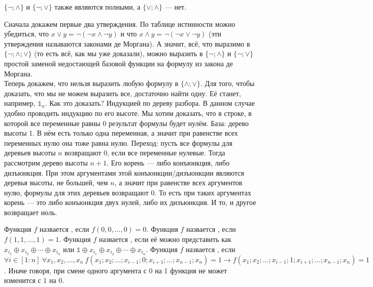 \documentclass{article}
\begin{document}
\begin{itemize}
\begin{Comment}
\begin{Example}
            \end{Example}
        \end{Comment}
        \thm $\{\neg;\land\}$ и $\{\neg;\lor\}$ также являются полными, а $\{\lor;\land\}$ --- нет.
        \begin{Proof}
            Сначала докажем первые два утверждения. По таблице истинности можно убедиться, что $x\lor y=\neg(\neg x\land\neg y)$ и что $x\land y=\neg(\neg x\lor\neg y)$ (эти утверждения называются законами де Моргана). А значит, всё, что выразимо в $\{\neg;\land;\lor\}$ (то есть всё, как мы уже доказали), можно выразить в $\{\neg;\land\}$ и $\{\neg;\lor\}$ простой заменой недостающей базовой функции на формулу из закона де Моргана.\\
            Теперь докажем, что нельзя выразить любую формулу в $\{\land;\lor\}$. Для того, чтобы доказать, что мы не можем выразить все, достаточно найти одну. Её станет, например, $\mathbb1_n$. Как это доказать? Индукцией по дереву разбора. В данном случае удобно проводить индукцию по его высоте. Мы хотим доказать, что в строке, в которой все переменные равны 0 результат формулы будет нулём. База: дерево высоты 1. В нём есть только одна переменная, а значит при равенстве всех переменных нулю она тоже равна нулю. Переход: пусть все формулы для деревьев высоты $n$ возвращают 0, если все переменные нулевые. Тогда рассмотрим дерево высоты $n+1$. Его корень --- либо конъюнкция, либо дизъюнкция. При этом аргументами этой конъюнкции/дизъюнкции являются деревья высоты, не большей, чем $n$, а значит при равенстве всех аргументов нулю, формулы для этих деревьев возвращают 0. То есть при таких аргументах корень --- это либо конъюнкция двух нулей, либо их дизъюнкция. И то, и другое возвращает ноль.
        \end{Proof}
        \dfn Функция $f$ назвается , если $f(0,0,\ldots,0)=0$.
        \dfn Функция $f$ назвается , если $f(1,1,\ldots,1)=1$.
        \dfn Функция $f$ назвается , если её можно представить как $x_{i_1}\oplus x_{i_2}\oplus\cdots\oplus x_{i_n}$ или $\mathbb1\oplus x_{i_1}\oplus x_{i_2}\oplus\cdots\oplus x_{i_n}$.
        \dfn Функция $f$ назвается , если $\forall i\in[1:n]~\forall x_1,x_2,\ldots,x_n~f(x_1;x_2;\ldots;x_{i-1};0;x_{i+1};\ldots;x_{n-1};x_n)=1\rightarrow f(x_1;x_2;\ldots;x_{i-1};1;x_{i+1};\ldots;x_{n-1};x_n)=1$. Иначе говоря, при смене одного аргумента с 0 на 1 функция не может изменится с 1 на 0.

\end{itemize}
\end{document}
